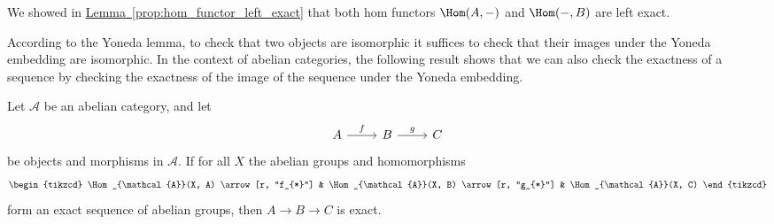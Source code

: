 \documentclass[main.tex]{subfiles}
\begin{document}
\begin{example}
  We showed in \hyperref[prop:hom_functor_left_exact]{Lemma~\ref*{prop:hom_functor_left_exact}} that both hom functors $\Hom(A, -)$ and $\Hom(-, B)$ are left exact.
\end{example}

According to the Yoneda lemma, to check that two objects are isomorphic it suffices to check that their images under the Yoneda embedding are isomorphic. In the context of abelian categories, the following result shows that we can also check the exactness of a sequence by checking the exactness of the image of the sequence under the Yoneda embedding.

\begin{lemma}
  \label{lemma:yoneda_reflects_exactness}
  Let $\mathcal{A}$ be an abelian category, and let
  \begin{equation*}
    \begin{tikzcd}
      A
      \arrow[r, "f"]
      & B
      \arrow[r, "g"]
      & C
    \end{tikzcd}
  \end{equation*}
  be objects and morphisms in $\mathcal{A}$. If for all $X$ the abelian groups and homomorphisms
  \begin{equation*}
    \begin{tikzcd}
      \Hom_{\mathcal{A}}(X, A)
      \arrow[r, "f_{*}"]
      & \Hom_{\mathcal{A}}(X, B)
      \arrow[r, "g_{*}"]
      & \Hom_{\mathcal{A}}(X, C)
    \end{tikzcd}
  \end{equation*}
  form an exact sequence of abelian groups, then $A \to B \to C$ is exact.
\end{lemma}
\end{document}
